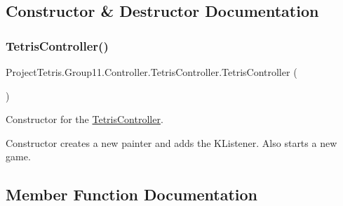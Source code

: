 \subsection{Constructor \& Destructor Documentation}
\hypertarget{class_project_tetris_1_1_group11_1_1_controller_1_1_tetris_controller_a4559dd5c986c8c0a1dc5e4da406196a0}{}\label{class_project_tetris_1_1_group11_1_1_controller_1_1_tetris_controller_a4559dd5c986c8c0a1dc5e4da406196a0} 
\subsubsection{\texorpdfstring{Tetris\+Controller()}{TetrisController()}}
{\footnotesize\ttfamily Project\+Tetris.\+Group11.\+Controller.\+Tetris\+Controller.\+Tetris\+Controller (\begin{DoxyParamCaption}{ }\end{DoxyParamCaption})}



Constructor for the \hyperlink{class_project_tetris_1_1_group11_1_1_controller_1_1_tetris_controller}{Tetris\+Controller}. 

Constructor creates a new painter and adds the K\+Listener. Also starts a new game. 

\subsection{Member Function Documentation}
\hypertarget{class_project_tetris_1_1_group11_1_1_controller_1_1_tetris_controller_afabce707cf2676db630a3219e818162b}{}\label{class_project_tetris_1_1_group11_1_1_controller_1_1_tetris_controller_afabce707cf2676db630a3219e818162b} 
